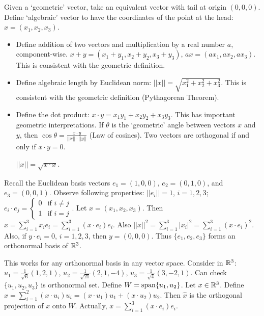 \documentclass[]{article}
\begin{document}
\begin{definition}
	Given a `geometric' vector, take an equivalent vector with tail at origin $(0,0,0)$. Define `algebraic' vector to have the coordinates of the point at the head: $x = (x_1,x_2,x_3)$.
	\begin{itemize}
		\item Define addition of two vectors and multiplication by a real number $a$, component-wise. $x+y = (x_1+y_1,x_2+y_2,x_3+y_3)$, $ax = (ax_1,ax_2,ax_3)$.
		This is consistent with the geometric definition.
		\item Define algebraic length by Euclidean norm: $||x|| = \sqrt{x_1^2+x_2^2 + x_3^2}$. This is consistent with the geometric definition (Pythagorean Theorem).
		\item Define the dot product: $x\cdot y = x_1y_1 + x_2y_2 + x_3y_3$. This has important geometric interpretations.
		If $\theta$ is the `geometric' angle between vectors $x$ and $y$, then $\cos{\theta} = \frac{x\cdot y}{||x|| \cdot ||y||}$ (Law of cosines). Two vectors are orthogonal if and only if $x\cdot y = 0$.
		\begin{note}
			$||x|| = \sqrt{x\cdot x}$.
		\end{note}
	\end{itemize}
	Recall the Euclidean basis vectors $e_1=(1,0,0)$, $e_2 = (0,1,0)$, and $e_3=(0,0,1)$.
	Observe following properties: $||e_i|| = 1$, $i=1,2,3$; $e_i\cdot e_j = \begin{cases} 0 & \text{if }i\neq j \\ 1 & \text{if }i=j \end{cases}$. Let $x = (x_1,x_2,x_3)$. Then $\displaystyle x = \sum_{i=1}^3 x_i e_i = \sum_{i=1}^3 (x\cdot e_i)e_i$.
	Also $||x||^2 = \sum_{i=1}^3 |x_i|^2 = \sum_{i=1}^3 (x\cdot e_i)^2$. Also, if $y\cdot e_i = 0$, $i=1,2,3$, then $y=(0,0,0)$.
	Thus $\{e_1,e_2,e_3\}$ forms an orthonormal basis of $\mathbb{R}^3$.
\end{definition}
\begin{example}
	This works for any orthonormal basis in any vector space. Consider in $\mathbb{R}^3$: $u_1 = \frac{1}{\sqrt{6}}(1,2,1)$, $u_2 = \frac{1}{\sqrt{21}}(2,1,-4)$, $u_3 = \frac{1}{\sqrt{4}}(3,-2,1)$. Can check $\{u_1,u_2,u_3\}$ is orthonormal set. Define $W = \text{span}\{u_1,u_2\}$. Let $x\in \mathbb{R}^3$. Define $\hat{x} = \sum_{i=1}^2 (x\cdot u_i)u_i = (x\cdot u_1)u_1 + (x\cdot u_2)u_2$. Then $\hat{x}$ is the orthogonal projection of $x$ onto $W$. Actually, $x=\sum_{i=1}^3 (x\cdot e_i)e_i$.
\end{example}
\end{document}
